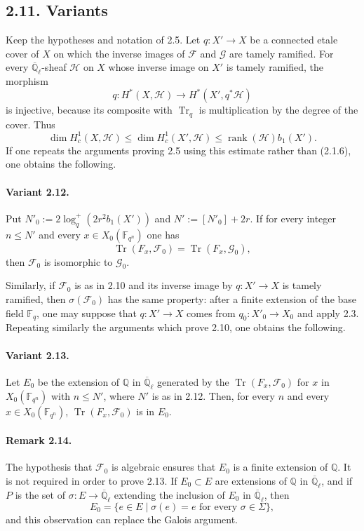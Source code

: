 \documentclass[10pt]{article}
\newcommand{\F}{\mathbb{F}}
\newcommand{\Q}{\mathbb{Q}}
\newcommand{\Ql}{\overline{\mathbb Q}_{\ell}}
\newcommand{\Tr}{\operatorname{Tr}}
\newcommand{\rank}{\operatorname{rank}}
\begin{document}
\subsection*{2.11. Variants}
Keep the hypotheses and notation of 2.5.
Let $q:X'\to X$ be a connected etale cover of $X$ on which the inverse images of $\mathcal F$ and $\mathcal G$ are tamely ramified.
For every $\Ql$-sheaf $\mathcal H$ on $X$ whose inverse image on $X'$ is tamely ramified, the morphism
\[
 q:H^*(X,\mathcal H)\to H^*(X',q^*\mathcal H)
\]
is injective, because its composite with $\Tr_q$ is multiplication by the degree of the cover.
Thus
\[
 \dim H^1_c(X,\mathcal H)\le \dim H^1_c(X',\mathcal H)\le \rank(\mathcal H)b_1(X').
\]
If one repeats the arguments proving 2.5 using this estimate rather than (2.1.6), one obtains the following.

\paragraph{Variant 2.12.}
Put $N'_0:=2\log_q^+(2r^2b_1(X'))$ and $N':=[N'_0]+2r$.
If for every integer $n\le N'$ and every $x\in X_0(\F_{q^n})$ one has
\[
 \Tr(F_x,\mathcal F_0)=\Tr(F_x,\mathcal G_0),
\]
then $\mathcal F_0$ is isomorphic to $\mathcal G_0$.

Similarly, if $\mathcal F_0$ is as in 2.10 and its inverse image by $q:X'\to X$ is tamely ramified, then $\sigma(\mathcal F_0)$ has the same property: after a finite extension of the base field $\F_q$, one may suppose that $q:X'\to X$ comes from $q_0:X'_0\to X_0$ and apply 2.3.
Repeating similarly the arguments which prove 2.10, one obtains the following.

\paragraph{Variant 2.13.}
Let $E_0$ be the extension of $\Q$ in $\Ql$ generated by the $\Tr(F_x,\mathcal F_0)$ for $x$ in $X_0(\F_{q^n})$ with $n\le N'$, where $N'$ is as in 2.12.
Then, for every $n$ and every $x\in X_0(\F_{q^n})$, $\Tr(F_x,\mathcal F_0)$ is in $E_0$.

\paragraph{Remark 2.14.}
The hypothesis that $\mathcal F_0$ is algebraic ensures that $E_0$ is a finite extension of $\Q$.
It is not required in order to prove 2.13.
If $E_0\subset E$ are extensions of $\Q$ in $\Ql$, and if $P$ is the set of $\sigma:E\to\Ql$ extending the inclusion of $E_0$ in $\Ql$, then
\[
 E_0=\{e\in E\mid \sigma(e)=e\text{ for every }\sigma\in\Sigma\},
\]
and this observation can replace the Galois argument.
\end{document}

